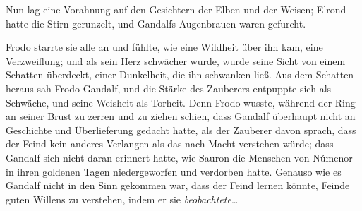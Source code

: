 Nun lag eine Vorahnung auf den Gesichtern der Elben und der Weisen; Elrond hatte die Stirn gerunzelt, und Gandalfs Augenbrauen waren gefurcht.

Frodo starrte sie alle an und fühlte, wie eine Wildheit über ihn kam, eine Verzweiflung; und als sein Herz schwächer wurde, wurde seine Sicht von einem Schatten überdeckt, einer Dunkelheit, die ihn schwanken ließ. Aus dem Schatten heraus sah Frodo Gandalf, und die Stärke des Zauberers entpuppte sich als Schwäche, und seine Weisheit als Torheit. Denn Frodo wusste, während der Ring an seiner Brust zu zerren und zu ziehen schien, dass Gandalf überhaupt nicht an Geschichte und Überlieferung gedacht hatte, als der Zauberer davon sprach, dass der Feind kein anderes Verlangen als das nach Macht verstehen würde; dass Gandalf sich nicht daran erinnert hatte, wie Sauron die Menschen von Númenor in ihren goldenen Tagen niedergeworfen und verdorben hatte. Genauso wie es Gandalf nicht in den Sinn gekommen war, dass der Feind lernen könnte, Feinde guten Willens zu verstehen, indem er sie \emph{beobachtete}…

